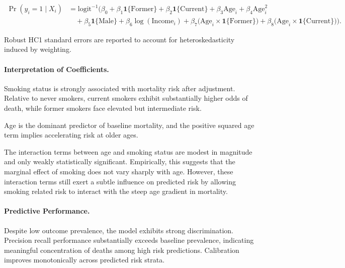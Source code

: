 \documentclass[12pt]{article}
\newcommand{\centertableinput}[1]{%
\begin{table}[H]
\centering

\end{table}
}
\begin{document}
\begin{align}
\Pr(y_i = 1 \mid X_i)
&= \text{logit}^{-1}\Big(
\beta_0
+ \beta_1 \mathbf{1}\{\text{Former}\}
+ \beta_2 \mathbf{1}\{\text{Current}\}
+ \beta_3 \text{Age}_i
+ \beta_4 \text{Age}_i^2
\nonumber\\
&\quad
+ \beta_5 \mathbf{1}\{\text{Male}\}
+ \beta_6 \log(\text{Income}_i)
+ \beta_7 \big(\text{Age}_i \times \mathbf{1}\{\text{Former}\}\big)
+ \beta_8 \big(\text{Age}_i \times \mathbf{1}\{\text{Current}\}\big)
\Big).
\end{align}

Robust HC1 standard errors are reported to account for heteroskedasticity induced by weighting.

\centertableinput{tables/ols_coefficients.tex}

\paragraph{Interpretation of Coefficients.}

Smoking status is strongly associated with mortality risk after adjustment. Relative to never smokers, current smokers exhibit substantially higher odds of death, while former smokers face elevated but intermediate risk.

Age is the dominant predictor of baseline mortality, and the positive squared age term implies accelerating risk at older ages.

The interaction terms between age and smoking status are modest in magnitude and only weakly statistically significant. Empirically, this suggests that the marginal effect of smoking does not vary sharply with age. However, these interaction terms still exert a subtle influence on predicted risk by allowing smoking related risk to interact with the steep age gradient in mortality.

\centertableinput{tables/logit_metrics_in_sample.tex}

\centertableinput{tables/logit_metrics_out_of_sample.tex}

\paragraph{Predictive Performance.}

Despite low outcome prevalence, the model exhibits strong discrimination. Precision recall performance substantially exceeds baseline prevalence, indicating meaningful concentration of deaths among high risk predictions. Calibration improves monotonically across predicted risk strata.
\end{document}
